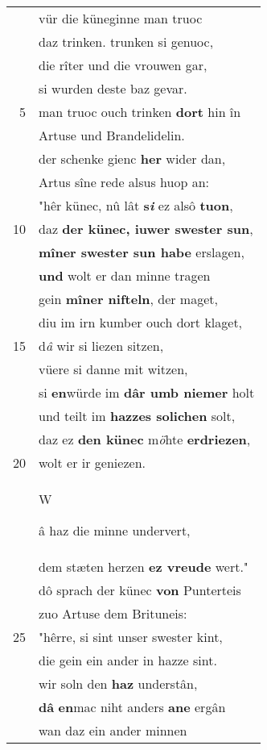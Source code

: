 \documentclass[8pt,a4paper,notitlepage]{article}
\begin{document}
\begin{table}[ht]
\begin{minipage}[t]{0.5\linewidth}
\begin{tabular}{rl}
 & vür die küneginne man truoc\\ 
 & daz trinken. trunken si genuoc,\\ 
 & die rîter und die vrouwen gar,\\ 
 & si wurden deste baz gevar.\\ 
5 & man truoc ouch trinken \textbf{dort} hin în\\ 
 & Artuse und Brandelidelin.\\ 
 & der schenke gienc \textbf{her} wider dan,\\ 
 & Artus sîne rede alsus huop an:\\ 
 & "hêr künec, nû lât \textbf{s\textit{i}} ez alsô \textbf{tuon},\\ 
10 & daz \textbf{der künec, iuwer swester sun},\\ 
 & \textbf{mîner swester sun habe} erslagen,\\ 
 & \textbf{und} wolt er dan minne tragen\\ 
 & gein \textbf{mîner nifteln}, der maget,\\ 
 & diu im irn kumber ouch dort klaget,\\ 
15 & d\textit{â} wir si liezen sitzen,\\ 
 & vüere si danne mit witzen,\\ 
 & si \textbf{en}würde im \textbf{dâr umb niemer} holt\\ 
 & und teilt im \textbf{hazzes solichen} solt,\\ 
 & daz ez \textbf{den künec} m\textit{ö}hte \textbf{erdriezen},\\ 
20 & wolt er ir geniezen.\\ 
 & \begin{large}W\end{large}â haz die minne undervert,\\ 
 & dem stæten herzen \textbf{ez vreude} wert."\\ 
 & dô sprach der künec \textbf{von} Punterteis\\ 
 & zuo Artuse dem Brituneis:\\ 
25 & "hêrre, si sint unser swester kint,\\ 
 & die gein ein ander in hazze sint.\\ 
 & wir soln den \textbf{haz} understân,\\ 
 & \textbf{dâ} \textbf{en}mac niht anders \textbf{ane} ergân\\ 
 & wan daz ein ander minnen\\ 

\end{tabular}
\end{minipage}
\end{table}
\end{document}
